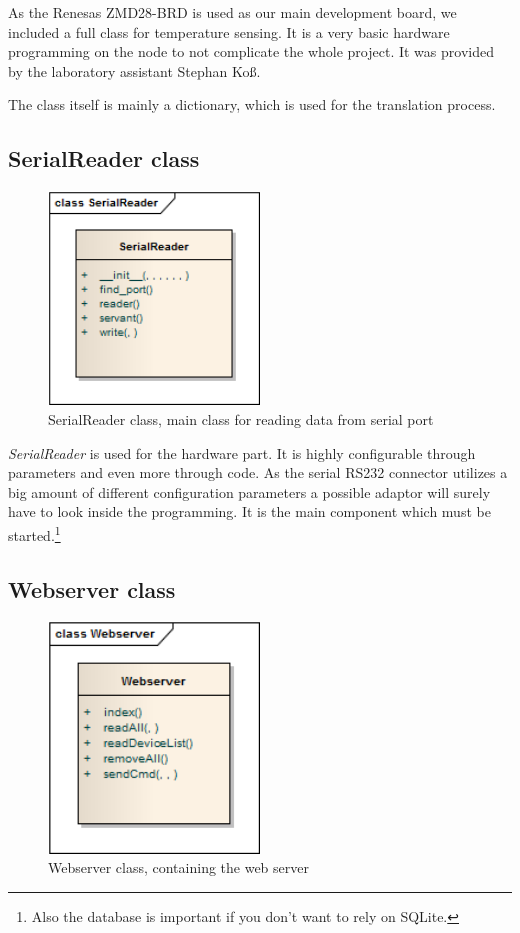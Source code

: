 As the Renesas ZMD28-BRD is used as our main development board, we included a full class for temperature sensing. It is a very 
basic hardware programming on the node to not complicate the whole project. It was provided by the laboratory assistant Stephan Ko\ss.

The class itself is mainly a dictionary, which is used for the translation process.

\newpage
\subsection{SerialReader class}
\begin{figure}[H]
   \centering
   \includegraphics[width=0.5\textwidth]{pic/SerialReader.png}%
   \caption{SerialReader class, main class for reading data from serial port}
   \label{SerialReaderpic}%
\end{figure}

\textit{SerialReader} is used for the hardware part. It is highly configurable through parameters and even more through code. As the
serial RS232 connector utilizes a big amount of different configuration parameters a possible adaptor will surely have to look inside the
programming. It is the main component which must be started.\footnote{Also the database is important if you don't want to rely on SQLite.}

\newpage
\subsection{Webserver class}
\begin{figure}[H]
   \centering
   \includegraphics[width=0.5\textwidth]{pic/Webserver.png}%
   \caption{Webserver class, containing the web server}
   \label{web serverpic}%
\end{figure}

